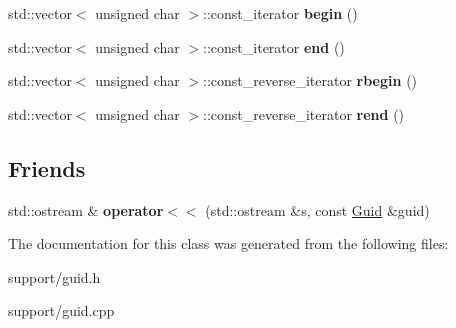 \begin{DoxyCompactItemize}
\mbox{\label{classGuid_a91ddee206946dad22d8330a16b5a3e29}} 
std\+::vector$<$ unsigned char $>$\+::const\+\_\+iterator {\bfseries begin} ()
\item 
\mbox{\label{classGuid_a0515167443c0ca27393611c0ef20cb38}} 
std\+::vector$<$ unsigned char $>$\+::const\+\_\+iterator {\bfseries end} ()
\item 
\mbox{\label{classGuid_ad4b5ed16ee361a49dbb32835a2b255ea}} 
std\+::vector$<$ unsigned char $>$\+::const\+\_\+reverse\+\_\+iterator {\bfseries rbegin} ()
\item 
\mbox{\label{classGuid_aed84d3d42c8bf2c41146ca33ad7fd2bb}} 
std\+::vector$<$ unsigned char $>$\+::const\+\_\+reverse\+\_\+iterator {\bfseries rend} ()
\end{DoxyCompactItemize}
\subsection*{Friends}
\begin{DoxyCompactItemize}
\item 
\mbox{\label{classGuid_a9f01105a685fe15263daa91f3edd9e86}} 
std\+::ostream \& {\bfseries operator$<$$<$} (std\+::ostream \&s, const \hyperlink{classGuid}{Guid} \&guid)
\end{DoxyCompactItemize}


The documentation for this class was generated from the following files\+:\begin{DoxyCompactItemize}
\item 
support/guid.\+h\item 
support/guid.\+cpp\end{DoxyCompactItemize}
